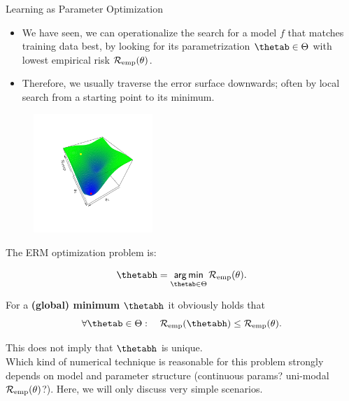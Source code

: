 \documentclass[11pt,compress,t,notes=noshow, xcolor=table]{beamer}
\begin{document}
\begin{vbframe}{Learning as Parameter Optimization}
\begin{itemize}
\item We have seen, we can operationalize the search for a model $f$ that matches
    training data best, by looking for its parametrization $\thetab \in \Theta$
    with lowest empirical risk $\mathcal{R}_{\text{emp}}(\theta)$.
\item Therefore, we usually traverse the error surface downwards; often by local search from a starting point to its minimum.
\end{itemize}
\begin{center}
\begin{figure}[!b]
\includegraphics[trim=2.4cm 2.4cm 2.4cm 2.4cm, width=0.4\textwidth]{figure/err_surf}
\end{figure}
\end{center}

\framebreak

The ERM optimization problem is:

\[
\thetabh  = \argmin_{\thetab \in \Theta} \risket .
\]

For a \textbf{(global) minimum} $\thetabh$ it obviously holds that 
\[
\forall \thetab \in \Theta :\quad \riske(\thetabh) \leq \risket .
\]

This does not imply that $\thetabh$ is unique. \\
\lz
Which kind of numerical technique is reasonable for this problem strongly depends 
on model and parameter structure (continuous params? uni-modal $\mathcal{R}_{\text{emp}}(\theta)$?). 
Here, we will only discuss very simple scenarios.

\end{vbframe}
\end{document}
